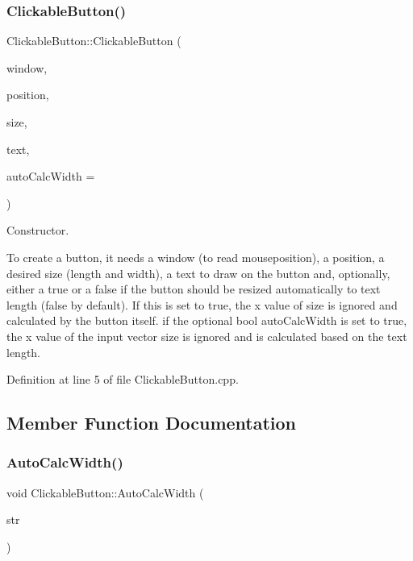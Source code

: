 \subsubsection{\texorpdfstring{Clickable\+Button()}{ClickableButton()}}
{\footnotesize\ttfamily Clickable\+Button\+::\+Clickable\+Button (\begin{DoxyParamCaption}\item[{sf\+::\+Render\+Window \&}]{window,  }\item[{sf\+::\+Vector2f}]{position,  }\item[{sf\+::\+Vector2f}]{size,  }\item[{std\+::string}]{text,  }\item[{bool}]{auto\+Calc\+Width = {} }\end{DoxyParamCaption})}



Constructor. 

To create a button, it needs a window (to read mouseposition), a position, a desired size (length and width), a text to draw on the button and, optionally, either a true or a false if the button should be resized automatically to text length (false by default). If this is set to true, the x value of size is ignored and calculated by the button itself. if the optional bool auto\+Calc\+Width is set to true, the x value of the input vector size is ignored and is calculated based on the text length. 

Definition at line 5 of file Clickable\+Button.\+cpp.



\subsection{Member Function Documentation}
\mbox{\label{class_clickable_button_a433c3e53d1ebf7b1ca847e90240b2a5c}} 
\subsubsection{\texorpdfstring{Auto\+Calc\+Width()}{AutoCalcWidth()}}
{\footnotesize\ttfamily void Clickable\+Button\+::\+Auto\+Calc\+Width (\begin{DoxyParamCaption}\item[{std\+::string}]{str }\end{DoxyParamCaption})}



